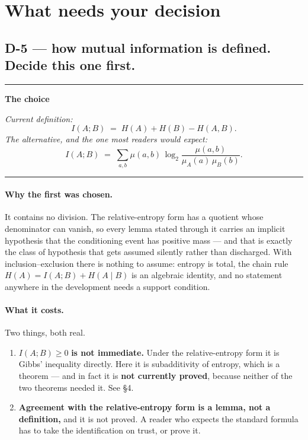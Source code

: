 \documentclass[11pt,a4paper]{article}
\newenvironment{decisionblock}[1]
  {\medskip\par\noindent\textcolor{decision}{\rule{\textwidth}{0.8pt}}\par\nobreak
   \smallskip\noindent\textbf{\textcolor{decision}{#1}}\par\nobreak\smallskip}
  {\par\noindent\textcolor{decision}{\rule{\textwidth}{0.4pt}}\medskip\par}
\begin{document}
\section{What needs your decision}

\noindent
{}

\subsection{D-5 --- how mutual information is defined. Decide this one first.}

\begin{decisionblock}{The choice}
\noindent\emph{Current definition:}
\[
  I(A;B) \;=\; H(A) + H(B) - H(A,B).
\]
\noindent\emph{The alternative, and the one most readers would expect:}
\[
  I(A;B) \;=\; \sum_{a,b}\mu(a,b)\,
    \log_2\frac{\mu(a,b)}{\mu_A(a)\,\mu_B(b)}.
\]
\end{decisionblock}

\paragraph{Why the first was chosen.}
It contains no division. The relative-entropy form has a quotient whose
denominator can vanish, so every lemma stated through it carries an implicit
hypothesis that the conditioning event has positive mass --- and that is exactly
the class of hypothesis that gets assumed silently rather than discharged. With
inclusion--exclusion there is nothing to assume: entropy is total, the chain rule
$H(A) = I(A;B)+H(A\mid B)$ is an algebraic identity, and no statement anywhere in
the development needs a support condition.

\paragraph{What it costs.} Two things, both real.
\begin{enumerate}[label=(\arabic*)]
  \item $I(A;B)\ge 0$ \textbf{is not immediate.} Under the relative-entropy form
        it is Gibbs' inequality directly. Here it is subadditivity of entropy,
        which is a theorem --- and in fact it is \textbf{not currently proved},
        because neither of the two theorems needed it. See \S4.
  \item \textbf{Agreement with the relative-entropy form is a lemma, not a
        definition,} and it is not proved. A reader who expects the standard
        formula has to take the identification on trust, or prove it.
\end{enumerate}
\end{document}
